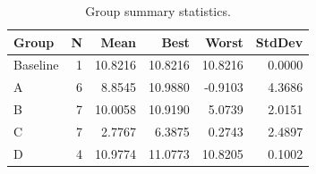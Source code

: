 \begin{table}[htbp]
\centering
\caption{Group summary statistics.}
\label{tab:group_summary}
\begin{tabular}{lrrrrr}
\toprule
\textbf{Group} & \textbf{N} & \textbf{Mean} & \textbf{Best} & \textbf{Worst} & \textbf{StdDev} \\
\midrule
Baseline & 1 & 10.8216 & 10.8216 & 10.8216 & 0.0000 \\
A & 6 & 8.8545 & 10.9880 & -0.9103 & 4.3686 \\
B & 7 & 10.0058 & 10.9190 & 5.0739 & 2.0151 \\
C & 7 & 2.7767 & 6.3875 & 0.2743 & 2.4897 \\
D & 4 & 10.9774 & 11.0773 & 10.8205 & 0.1002 \\
\bottomrule
\end{tabular}
\end{table}